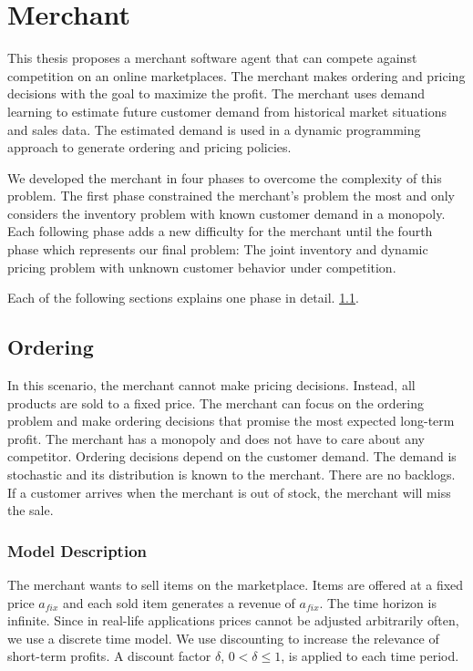 
\chapter{Merchant}
This thesis proposes a merchant software agent that can compete against competition on an online marketplaces.
The merchant makes ordering and pricing decisions with the goal to maximize the profit.
The merchant uses demand learning to estimate future customer demand from historical market situations and sales data.
The estimated demand is used in a dynamic programming approach to generate ordering and pricing policies.

We developed the merchant in four phases to overcome the complexity of this problem.
The first phase constrained the merchant's problem the most and only considers the inventory problem with known customer demand in a monopoly.
Each following phase adds a new difficulty for the merchant until the fourth phase which represents our final problem: The joint inventory and dynamic pricing problem with unknown customer behavior under competition.

Each of the following sections explains one phase in detail.
 \cref{section:ordering}.

\section{Ordering}
\label{section:ordering}
In this scenario, the merchant cannot make pricing decisions.
Instead, all products are sold to a fixed price.
The merchant can focus on the ordering problem and make ordering decisions that promise the most expected long-term profit.
The merchant has a monopoly and does not have to care about any competitor.
Ordering decisions depend on the customer demand.
The demand is stochastic and its distribution is known to the merchant.
There are no backlogs. %
If a customer arrives when the merchant is out of stock, the merchant will miss the sale.

\subsection{Model Description}
\label{subs:ordering_model}
The merchant wants to sell items on the marketplace.
Items are offered at a fixed price $a_{fix}$ and each sold item generates a revenue of $a_{fix}$.
The time horizon is infinite.
Since in real-life applications prices cannot be adjusted arbitrarily often, we use a discrete time
model.
We use discounting to increase the relevance of short-term profits.
A discount factor $\delta$, $0 < \delta \leq 1$, is applied to each time period.

